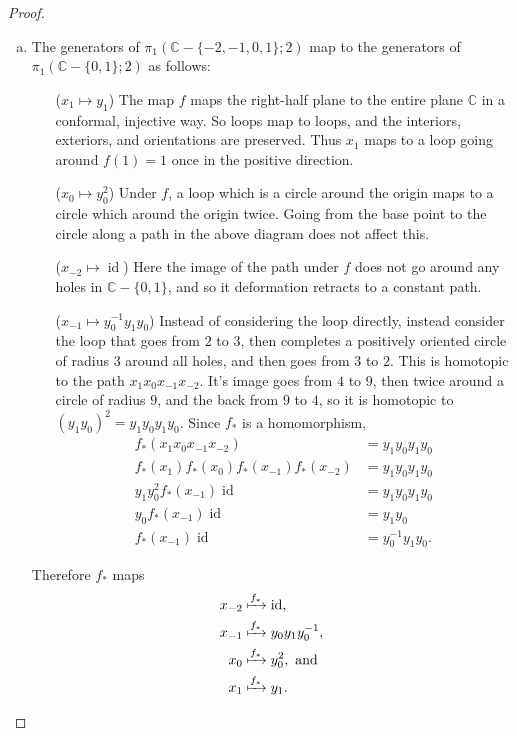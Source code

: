 \documentclass{article}
\begin{document}
\begin{proof}
\begin{enumerate}[a.]
    \item
    The generators of $\pi_1(\mathbb C - \{-2, -1, 0, 1\}; 2)$ map to the
    generators of $\pi_1(\mathbb C - \{0, 1\}; 2)$ as follows:
    \begin{enumerate}[label={},align=left]
      \item[($x_1 \mapsto y_1$)]
      The map $f$ maps the right-half plane to the entire plane $\mathbb C$ in a
      conformal, injective way. So loops map to loops, and the interiors,
      exteriors, and orientations are preserved. Thus $x_1$ maps to a loop going
      around $f(1) = 1$ once in the positive direction.
      \item[($x_0 \mapsto y_0^2$)]
      Under $f$, a loop which is a circle around the origin maps to a
      circle which around the origin twice. Going from the base point to the
      circle along a path in the above diagram does not affect this.
      \item[($x_{-2} \mapsto \operatorname{id}$)]
      Here the image of the path under $f$ does not go around any holes in
      $\mathbb C - \{0, 1\}$, and so it deformation retracts to a constant path.
      \item[($x_{-1} \mapsto y_0^{-1}y_1y_0$)] Instead of considering the loop
      directly, instead consider the loop that goes from $2$ to $3$, then
      completes a positively oriented circle of radius $3$ around all holes,
      and then goes from $3$ to $2$. This is homotopic to the path
      $x_1x_0x_{-1}x_{-2}$. It's image goes from $4$ to $9$, then twice around
      a circle of radius $9$, and the back from $9$ to $4$, so it is homotopic
      to $(y_1y_0)^2 = y_1y_0y_1y_0$.
      Since $f_*$ is a homomorphism, \begin{align*}
          f_*(x_1x_0x_{-1}x_{-2}) &= y_1y_0y_1y_0 \\
          f_*(x_1)f_*(x_0)f_*(x_{-1})f_*(x_{-2}) &= y_1y_0y_1y_0 \\
          y_1y_0^2f_*(x_{-1})\operatorname{id} &= y_1y_0y_1y_0 \\
          y_0f_*(x_{-1})\operatorname{id} &= y_1y_0 \\
          f_*(x_{-1})\operatorname{id} &= y_0^{-1}y_1y_0.
      \end{align*}
    \end{enumerate}
    Therefore $f_*$ maps
    \begin{align*}
      x_{-2} &\xmapsto{f_*} \operatorname{id},\\
      x_{-1} &\xmapsto{f_*} y_0y_1y_0^{-1},\\
      x_0    &\xmapsto{f_*} y_0^2, \text{ and} \\
      x_1    &\xmapsto{f_*} y_1.
    \end{align*}
  \end{enumerate}
\end{proof}
\end{document}
